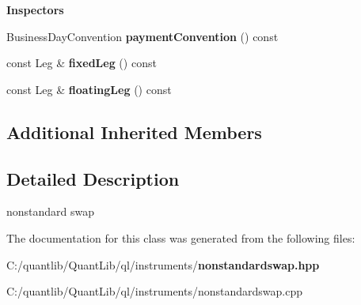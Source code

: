 \begin{Indent}{\bf Inspectors}
\begin{DoxyCompactItemize}
\item 
Business\+Day\+Convention {\bfseries payment\+Convention} () const \label{class_quant_lib_1_1_nonstandard_swap_ae47cd90eb3e7e26a402b9f0f57e61c81}

\item 
const Leg \& {\bfseries fixed\+Leg} () const \label{class_quant_lib_1_1_nonstandard_swap_a4d68432ad5831fac4b586269555bb1fb}

\item 
const Leg \& {\bfseries floating\+Leg} () const \label{class_quant_lib_1_1_nonstandard_swap_a7a25d9b71d47fdc5cb231540830b0e70}

\end{DoxyCompactItemize}
\end{Indent}
\subsection*{Additional Inherited Members}


\subsection{Detailed Description}
nonstandard swap 

The documentation for this class was generated from the following files\+:\begin{DoxyCompactItemize}
\item 
C\+:/quantlib/\+Quant\+Lib/ql/instruments/{\bf nonstandardswap.\+hpp}\item 
C\+:/quantlib/\+Quant\+Lib/ql/instruments/nonstandardswap.\+cpp\end{DoxyCompactItemize}
